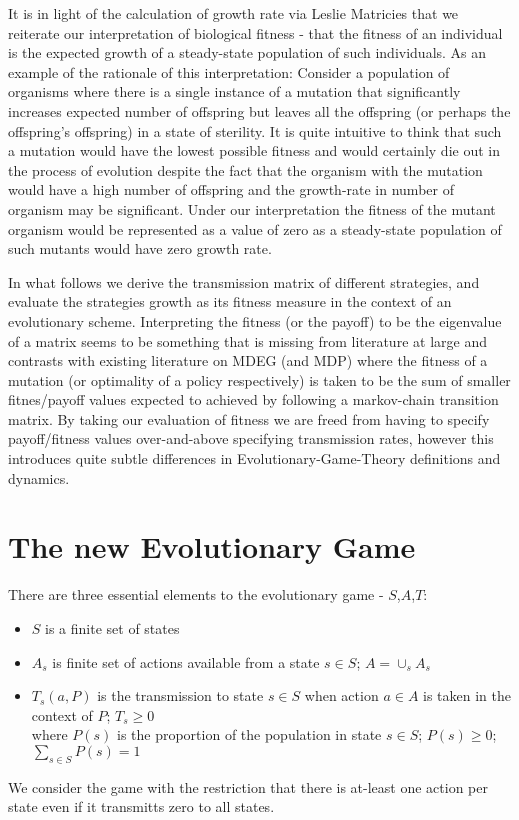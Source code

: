 \documentclass[journal,article,accept,oneauthors,pdftex,10pt,a4paper]{mdpi}
\begin{document}
It is in light of the calculation of growth rate via Leslie Matricies that we reiterate our interpretation of biological fitness - that the fitness of an individual is the expected growth of a steady-state population of such individuals.
As an example of the rationale of this interpretation: Consider a population of organisms where there is a single instance of a mutation that significantly increases expected number of offspring but leaves all the offspring (or perhaps the offspring's offspring) in a state of sterility.
It is quite intuitive to think that such a mutation would have the lowest possible fitness and would certainly die out in the process of evolution despite the fact that the organism with the mutation would have a high number of offspring and the growth-rate in number of organism may be significant. Under our interpretation the fitness of the mutant organism would be represented as a value of zero as a steady-state population of such mutants would have zero growth rate.

In what follows we derive the transmission matrix of different strategies, and evaluate the strategies growth as its fitness measure in the context of an evolutionary scheme.
Interpreting the fitness (or the payoff) to be the eigenvalue of a matrix seems to be something that is missing from literature at large and contrasts with existing literature on MDEG (and MDP) where the fitness of a mutation (or optimality of a policy respectively) is taken to be the sum of smaller fitnes/payoff values expected to achieved by following a markov-chain transition matrix.
By taking our evaluation of fitness we are freed from having to specify payoff/fitness values over-and-above specifying transmission rates, however this introduces quite subtle differences in Evolutionary-Game-Theory definitions and dynamics.

\section{The new Evolutionary Game}

There are three essential elements to the evolutionary game - $S$,$A$,$T$:
\begin{itemize}[leftmargin=*,labelsep=4mm]
\item	$S$ is a finite set of states
\item	$A_s$ is finite set of actions available from a state $s\in S$; $A=\cup_s A_s$
\item	$T_s(a,P)$ is the transmission to state $s\in S$ when action $a\in A$ is taken in the context of $P$; $T_s\ge 0$\\ where $P(s)$ is the proportion of the population in state $s\in S$; $P(s)\ge 0$; $\sum_{s\in S}P(s)=1$
\end{itemize}
We consider the game with the restriction that there is at-least one action per state even if it transmitts zero to all states.
\end{document}
